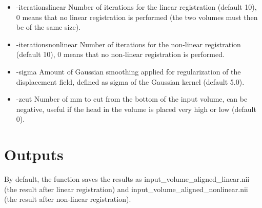 \begin{itemize}

\item -iterationslinear          
\newline \newline Number of iterations for the linear registration (default 10), 0 means that no linear registration is performed (the two volumes must then be of the same size).  

\newpage

\item -iterationsnonlinear       
\newline \newline Number of iterations for the non-linear registration (default 10), 0 means that no non-linear registration is performed. 


\item -sigma                    
\newline \newline Amount of Gaussian smoothing applied for regularization of the displacement field, defined as sigma of the Gaussian kernel (default 5.0).

\item -zcut                      
\newline \newline Number of mm to cut from the bottom of the input volume, can be negative, useful if the head in the volume is placed very high or low (default 0). 

\end{itemize}

\section{Outputs}

By default, the function saves the results as input\_volume\_aligned\_linear.nii (the result after linear registration) and input\_volume\_aligned\_nonlinear.nii (the result after non-linear registration). 


